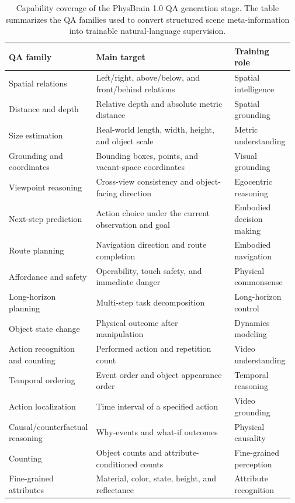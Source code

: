 {\footnotesize
\setlength{\tabcolsep}{3pt}
\renewcommand{\arraystretch}{1.3}
\begin{longtable}{@{}p{0.27\linewidth}p{0.49\linewidth}p{0.21\linewidth}@{}}
\caption{Capability coverage of the PhysBrain 1.0 QA generation stage. The table summarizes the QA families used to
convert structured scene meta-information into trainable natural-language supervision.}\\
\toprule
\textbf{QA family} & \textbf{Main target} & \textbf{Training role} \\
\midrule
Spatial relations & Left/right, above/below, and front/behind relations & Spatial intelligence \\
Distance and depth & Relative depth and absolute metric distance & Spatial grounding \\
Size estimation & Real-world length, width, height, and object scale & Metric understanding \\
Grounding and coordinates & Bounding boxes, points, and vacant-space coordinates & Visual grounding \\
Viewpoint reasoning & Cross-view consistency and object-facing direction & Egocentric reasoning \\
Next-step prediction & Action choice under the current observation and goal & Embodied decision making \\
Route planning & Navigation direction and route completion & Embodied navigation \\
Affordance and safety & Operability, touch safety, and immediate danger & Physical commonsense \\
Long-horizon planning & Multi-step task decomposition & Long-horizon control \\
Object state change & Physical outcome after manipulation & Dynamics modeling \\
Action recognition and counting & Performed action and repetition count & Video understanding \\
Temporal ordering & Event order and object appearance order & Temporal reasoning \\
Action localization & Time interval of a specified action & Video grounding \\
Causal/counterfactual reasoning & Why-events and what-if outcomes & Physical causality \\
Counting & Object counts and attribute-conditioned counts & Fine-grained perception \\
Fine-grained attributes & Material, color, state, height, and reflectance & Attribute recognition \\

\end{longtable}}

